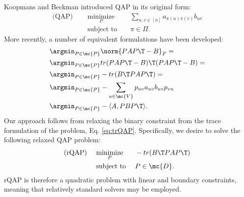 \documentclass[10pt,journal,cspaper,compsoc]{IEEEtran}
\newcommand{\PmcP}{P \in \mc{P}}
\begin{document}
Koopmans and Beckman \cite{Koopmans} introduced QAP in its original form:
\begin{subequations}
\begin{align}
	\text{(QAP) } \quad &\underset{P}{\text{minimize}}  &&\sum_{u,v \in [n]} a_{\pi(u)\pi(v)} b_{uv}  \\
	&\text{subject to } && \pi \in \Pi.
\end{align}
\end{subequations}
More recently, a number of equivalent formulations have been developed:
\begin{subequations} \label{eq:QAP}
\begin{align}
	&\argmin_{\PmcP} \norm{PAP\T - B}_F = \\
	&\argmin_{\PmcP} tr(PAP\T - B)\T (PAP\T - B)  = \\
	&\argmin_{\PmcP} - tr(B\T PAP\T)= \label{eq:trQAP}\\ %
	&\argmin_{\PmcP}  -\sum_{u \in \mc{V}} p_{uv} a_{uv} b_{uv} p_{vu} 
	\\&\argmin_{\PmcP}  -\langle A, PBP\T \rangle.
\end{align}
\end{subequations}
Our approach follows from relaxing the binary constraint from the trace formulation of the problem, Eq. \eqref{eq:trQAP}.  Specifically, we desire to solve the following relaxed QAP problem:
\begin{subequations} \label{eq:rQAP}
\begin{align}
		\text{(rQAP) } \quad &\underset{P}{\text{minimize}}  && - tr(B\T PAP\T)  \\
		&\text{subject to } && P \in \mc{D}.
\end{align}
\end{subequations}
rQAP is therefore a quadratic problem with linear and boundary constraints, meaning that relatively standard solvers may be employed.
\end{document}
